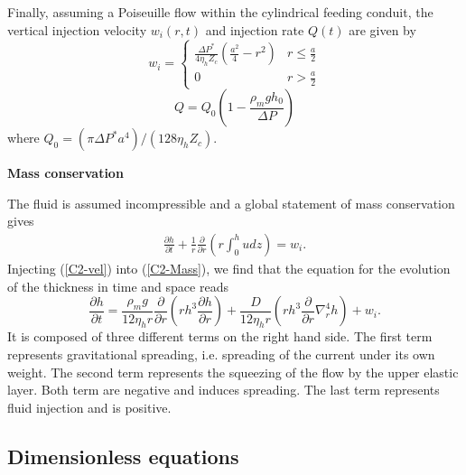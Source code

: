 Finally,  assuming a  Poiseuille flow  within the  cylindrical feeding
conduit, the vertical injection velocity $w_i(r,t)$ and injection rate
$Q(t)$ are given by
\begin{equation}
  w_i=
  \begin{cases}
    \frac{ \Delta P^*}{4 \eta_h Z_{c}} (\frac{a^{2}}{4}-r^{2})& r \le \frac{a}{2}\\
    0 & r > \frac{a}{2}
  \end{cases}
  \label{C2-eq12}
\end{equation}
\begin{equation}
  Q = Q_0(1-\frac{\rho_m g h_0}{\Delta P})
  \label{C2-eq11}
\end{equation}
where
$Q_0=\left(\pi \Delta P^* a^{4}\right)/\left(128 \eta_h Z_c\right)$.

\vspace{.5cm} \textbf{Mass conservation} \vspace{.5cm}

The fluid  is assumed  incompressible and a  global statement  of mass
conservation gives
\begin{eqnarray}
  \frac{\partial         h}{\partial        t} +\frac{1}{r}
  \frac{\partial}{\partial
  r} \left( r\int_0^hudz\right) = w_i.
  \label{C2-Mass}
\end{eqnarray}
Injecting  (\ref{C2-vel})  into  (\ref{C2-Mass}),  we  find  that  the
equation for the evolution of the thickness in time and space reads
\begin{equation}
  \frac{\partial h}{\partial t} =\frac{\rho_mg}{12 \eta_h r}
  \frac{\partial}{\partial r}  \left( rh^3  \frac{\partial h}{\partial
      r}\right)+\frac{D}{12\eta_h r} \left( rh^3 \frac{\partial}{\partial r}\nabla_r^4h\right)+
  w_i .\label{C2-Heq}
\end{equation}
It is  composed of three different  terms on the right  hand side. The
first term represents gravitational  spreading, i.e.  spreading of the
current under its own weight. The second term represents the squeezing
of the  flow by the upper  elastic layer.  Both term  are negative and
induces spreading.   The last term  represents fluid injection  and is
positive.

\subsection{Dimensionless equations}
\label{C2-sec:dimens-equat}

